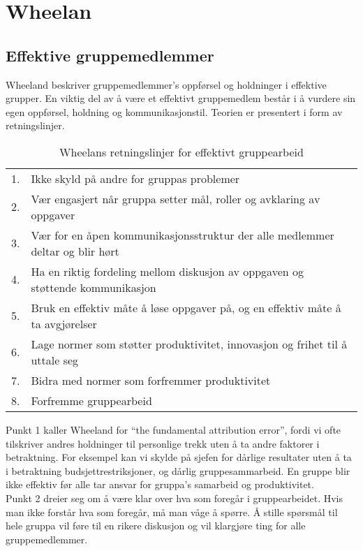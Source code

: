 \section{Wheelan}
\subsection{Effektive gruppemedlemmer}

Wheeland beskriver gruppemedlemmer's oppførsel og holdninger i effektive grupper. En viktig del av å være et effektivt gruppemedlem består i å vurdere sin egen oppførsel, holdning og kommunikasjonstil. Teorien er presentert i form av retningslinjer. 

\begin{center}
\begin{table}[ht!]
\begin{tabular}{r l}
1. & Ikke skyld på andre for gruppas problemer \\
2. & Vær engasjert når gruppa setter mål, roller og avklaring av oppgaver \\
3. & Vær for en åpen kommunikasjonsstruktur der alle medlemmer deltar og blir
hørt \\
4. & Ha en riktig fordeling mellom diskusjon av oppgaven og støttende
kommunikasjon \\
5. & Bruk en effektiv måte å løse oppgaver på, og en effektiv måte å ta
avgjørelser \\
6. & Lage normer som støtter produktivitet, innovasjon og frihet til å uttale
seg \\
7. & Bidra med normer som forfremmer produktivitet \\
8. & Forfremme gruppearbeid
\end{tabular}
\caption{Wheelans retningslinjer for effektivt gruppearbeid}
\label{tab:Wheelan}
\end{table}
\end{center}

Punkt 1 kaller Wheeland for ``the fundamental attribution error'', fordi vi ofte tilskriver andres holdninger til personlige trekk uten å ta andre faktorer i betraktning. For eksempel kan vi skylde på sjefen for dårlige resultater uten å ta i betraktning budsjettrestriksjoner, og dårlig gruppesammarbeid. En gruppe blir ikke effektiv før alle tar ansvar for gruppa's samarbeid og produktivitet. \\

Punkt 2 dreier seg om å være klar over hva som foregår i gruppearbeidet. Hvis man ikke forstår hva som foregår, må man våge å spørre. Å stille spørsmål til hele gruppa vil føre til en rikere diskusjon og vil klargjøre ting for alle gruppemedlemmer. \\


